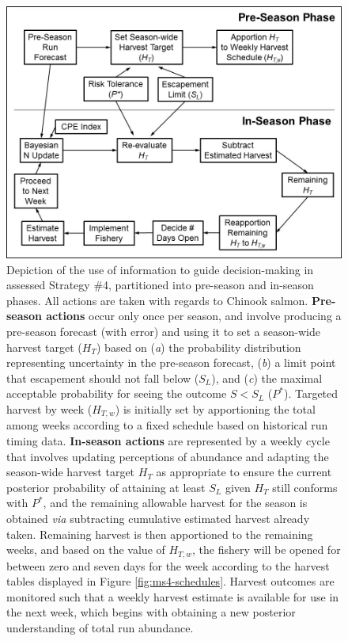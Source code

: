 \documentclass[12pt,]{book}
\theoremstyle{definition}
\theoremstyle{definition}
\theoremstyle{definition}
\theoremstyle{remark}
\begin{document}
\begin{singlespace}
\begin{figure}
  \centering
  \includegraphics{img/Ch3/ms4-flow-diag.jpg}
  \caption{Depiction of the use of information to guide decision-making in assessed Strategy \#4, partitioned into pre-season and in-season phases. All actions are taken with regards to Chinook salmon. \textbf{Pre-season actions} occur only once per season, and involve producing a pre-season forecast (with error) and using it to set a season-wide harvest target ($H_T$) based on (\textit{a}) the probability distribution representing uncertainty in the pre-season forecast, (\textit{b}) a limit point that escapement should not fall below ($S_L$), and (\textit{c}) the maximal acceptable probability for seeing the outcome $S < S_L$ ($P^*$). Targeted harvest by week ($H_{T,w}$) is initially set by apportioning the total among weeks according to a fixed schedule based on historical run timing data. \textbf{In-season actions} are represented by a weekly cycle that involves updating perceptions of abundance and adapting the season-wide harvest target $H_T$ as appropriate to ensure the current posterior probability of attaining at least $S_L$ given $H_T$ still conforms with $P^*$, and the remaining allowable harvest for the season is obtained \textit{via} subtracting cumulative estimated harvest already taken. Remaining harvest is then apportioned to the remaining weeks, and based on the value of $H_{T,w}$, the fishery will be opened for between zero and seven days for the week according to the harvest tables displayed in Figure \ref{fig:ms4-schedules}. Harvest outcomes are monitored such that a weekly harvest estimate is available for use in the next week, which begins with obtaining a new posterior understanding of total run abundance.}
  \label{fig:ms4-flow-diag}
\end{figure}


\end{singlespace}
\end{document}
